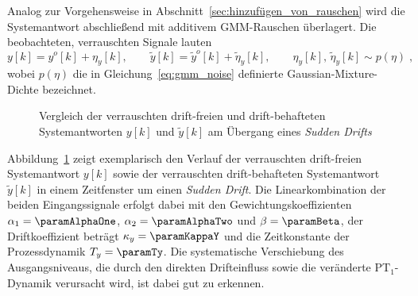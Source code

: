 Analog zur Vorgehensweise in Abschnitt~\ref{sec:hinzufügen_von_rauschen} wird die Systemantwort abschließend mit additivem \ac{GMM}-Rauschen überlagert. Die beobachteten, verrauschten Signale lauten
%
\begin{equation}
    y[k] = y^o[k] + \eta_y[k], \qquad
    \tilde{y}[k] = \tilde{y}^o[k] + \tilde{\eta}_y[k], \qquad
    \eta_y[k],\, \tilde{\eta}_y[k] \sim p(\eta) \; ,
    \label{eq:systemantwort_noisy}
\end{equation}
%
wobei $p(\eta)$ die in Gleichung~\eqref{eq:gmm_noise} definierte
Gaussian-Mixture-Dichte bezeichnet. \par
%
\begin{figure}[bt!]
    \centering
    \makebox[\textwidth][c]{%
        
    }
    \caption{Vergleich der verrauschten drift-freien und drift-behafteten Systemantworten $y[k]$ und $\tilde{y}[k]$ am Übergang eines \emph{Sudden Drifts}} 
    \label{fig:wiener_output}
\end{figure}
%
Abbildung~\ref{fig:wiener_output} zeigt exemplarisch den Verlauf der verrauschten drift-freien Systemantwort $y[k]$ sowie der verrauschten drift-behafteten Systemantwort $\tilde{y}[k]$ in einem Zeitfenster um einen \emph{Sudden Drift}. Die Linearkombination der beiden Eingangssignale erfolgt dabei mit den Gewichtungskoeffizienten $\alpha_1 = \paramAlphaOne$, $\alpha_2 = \paramAlphaTwo$ und $\beta = \paramBeta$, der Driftkoeffizient beträgt $\kappa_y = \paramKappaY$ und die Zeitkonstante der Prozessdynamik $T_y = \paramTy$. Die systematische Verschiebung des Ausgangsniveaus, die durch den direkten Drifteinfluss sowie die veränderte $\mathrm{PT}_1$-Dynamik verursacht wird, ist dabei gut zu erkennen. 
%
